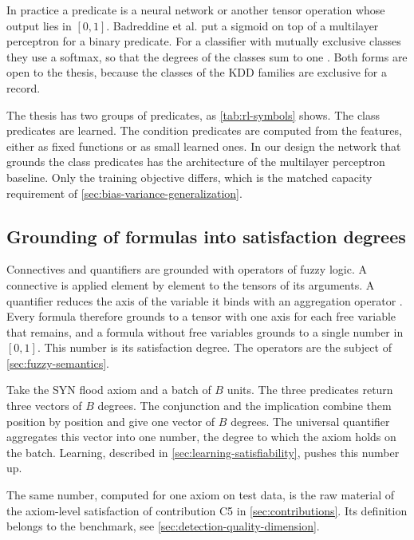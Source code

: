 In practice a predicate is a neural network or another tensor operation whose
output lies in $[0,1]$. Badreddine et al. put a sigmoid on top of a multilayer
perceptron for a binary predicate. For a classifier with mutually exclusive
classes they use a softmax, so that the degrees of the classes sum to one
\citep{badreddine2022ltn}. Both forms are open to the thesis, because the
classes of the KDD families are exclusive for a record.

The thesis has two groups of predicates, as \cref{tab:rl-symbols} shows. The
class predicates are learned. The condition predicates are computed from the
features, either as fixed functions or as small learned ones. In our design the
network that grounds the class predicates has the architecture of the
multilayer perceptron baseline. Only the training objective differs, which is
the matched capacity requirement of \cref{sec:bias-variance-generalization}.

\subsection{Grounding of formulas into satisfaction degrees}
\label{sec:grounding-formulas}

Connectives and quantifiers are grounded with operators of fuzzy logic. A
connective is applied element by element to the tensors of its arguments. A
quantifier reduces the axis of the variable it binds with an aggregation
operator \citep{badreddine2022ltn}. Every formula therefore grounds to a
tensor with one axis for each free variable that remains, and a formula
without free variables grounds to a single number in $[0,1]$. This number is
its satisfaction degree. The operators are the subject of
\cref{sec:fuzzy-semantics}.

Take the SYN flood axiom and a batch of $B$ units. The three predicates
return three vectors of $B$ degrees. The conjunction and the implication
combine them position by position and give one vector of $B$ degrees. The
universal quantifier aggregates this vector into one number, the degree to
which the axiom holds on the batch. Learning, described in
\cref{sec:learning-satisfiability}, pushes this number up.

The same number, computed for one axiom on test data, is the raw material of
the axiom-level satisfaction of contribution C5 in \cref{sec:contributions}.
Its definition belongs to the benchmark, see
\cref{sec:detection-quality-dimension}.

